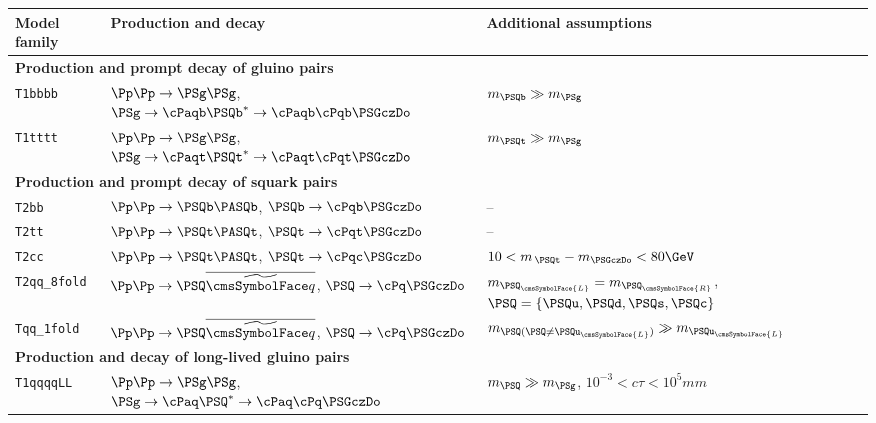 \begingroup
\renewcommand*{\arraystretch}{1.2}
\begin{table}[!b]
  \label{tab:sms}
  \centering
  \begin{tabular}{ lll }
    \hline
    Model family
    & Production and decay
    & Additional assumptions                                                         \\
    \hline
    \multicolumn{3}{l}{\bf Production and prompt decay of gluino pairs}           \\
    \texttt{T1bbbb}
    & $\Pp\Pp \to \PSg\PSg$,
    $\PSg\to \cPaqb\PSQb^* \to \cPaqb\cPqb\PSGczDo$
    & $m_{\PSQb} \gg m_{\PSg}$                                                       \\
    \texttt{T1tttt}
    & $\Pp\Pp \to \PSg\PSg$,
    $\PSg\to \cPaqt\PSQt^* \to \cPaqt\cPqt\PSGczDo$                                                                   
    & $m_{\PSQt} \gg m_{\PSg}$                                                       \\
    \multicolumn{3}{l}{\bf Production and prompt decay of squark pairs}           \\
    \texttt{T2bb}
    & $\Pp\Pp \to \PSQb\PASQb$,
    $\PSQb \to \cPqb\PSGczDo$
    & --                                                                             \\
    \texttt{T2tt}
    & $\Pp\Pp \to \PSQt\PASQt$,
    $\PSQt \to \cPqt\PSGczDo$
    & --                                                                             \\
    \texttt{T2cc}
    & $\Pp\Pp \to \PSQt\PASQt$,
    $\PSQt\to \cPqc\PSGczDo$
    & $10 < m_{\,\PSQt} - m_{\PSGczDo} < 80\GeV$                                     \\
    \texttt{T2qq\_8fold}
    & $\Pp\Pp \to \PSQ\PASQ$,
    $\PSQ \to \cPq\PSGczDo$
    & $m_{\PSQ_\cmsSymbolFace{L}} = m_{\PSQ_\cmsSymbolFace{R}}$,
    $\PSQ = \{ \PSQu, \PSQd, \PSQs, \PSQc \}$                                     \\
    \texttt{Tqq\_1fold}
    & $\Pp\Pp \to \PSQ\PASQ$,
    $\PSQ \to \cPq\PSGczDo$
    & $m_{\PSQ (\PSQ \neq \PSQu_\cmsSymbolFace{L})} \gg m_{\PSQu_\cmsSymbolFace{L}}$ \\
    \multicolumn{3}{l}{\bf Production and decay of long-lived gluino pairs}       \\
    \texttt{T1qqqqLL}
    & $\Pp\Pp \to \PSg\PSg$,
    $\PSg \to \cPaq\PSQ^* \to \cPaq\cPq\PSGczDo$    
    & $m_{\PSQ} \gg m_{\PSg}$, $10^{-3} < c\tau < 10^{5}\unit{mm}$                   \\
    \hline
  \end{tabular}
\end{table}
\endgroup 

